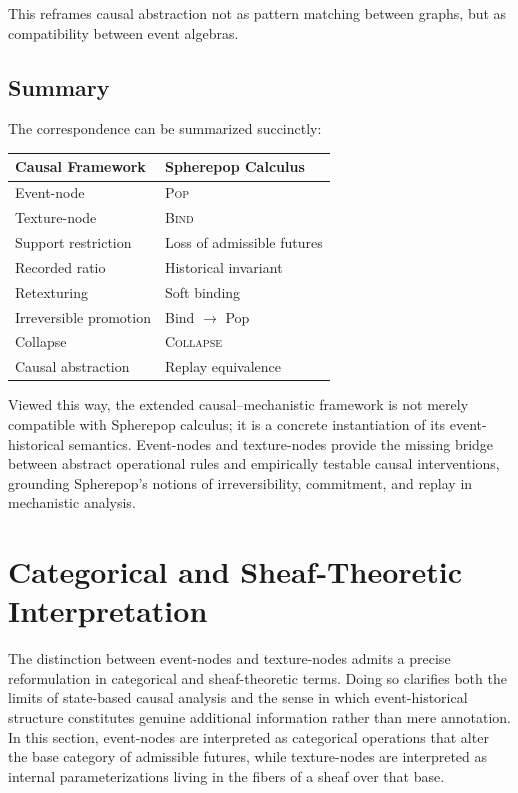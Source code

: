 \documentclass[11pt]{article}
\begin{document}
This reframes causal abstraction not as pattern matching between graphs, but as
compatibility between event algebras.

\subsection{Summary}

The correspondence can be summarized succinctly:
\begin{center}
\begin{tabular}{ll}
\toprule
\textbf{Causal Framework} & \textbf{Spherepop Calculus} \\
\midrule
Event-node & \textsc{Pop} \\
Texture-node & \textsc{Bind} \\
Support restriction & Loss of admissible futures \\
Recorded ratio & Historical invariant \\
Retexturing & Soft binding \\
Irreversible promotion & Bind $\rightarrow$ Pop \\
Collapse & \textsc{Collapse} \\
Causal abstraction & Replay equivalence \\
\bottomrule
\end{tabular}
\end{center}

Viewed this way, the extended causal–mechanistic framework is not merely
compatible with Spherepop calculus; it is a concrete instantiation of its
event-historical semantics. Event-nodes and texture-nodes provide the missing
bridge between abstract operational rules and empirically testable causal
interventions, grounding Spherepop’s notions of irreversibility, commitment,
and replay in mechanistic analysis.

\section{Categorical and Sheaf-Theoretic Interpretation}

The distinction between event-nodes and texture-nodes admits a precise
reformulation in categorical and sheaf-theoretic terms. Doing so clarifies both
the limits of state-based causal analysis and the sense in which event-historical
structure constitutes genuine additional information rather than mere
annotation. In this section, event-nodes are interpreted as categorical
operations that alter the base category of admissible futures, while
texture-nodes are interpreted as internal parameterizations living in the
fibers of a sheaf over that base.
\end{document}
